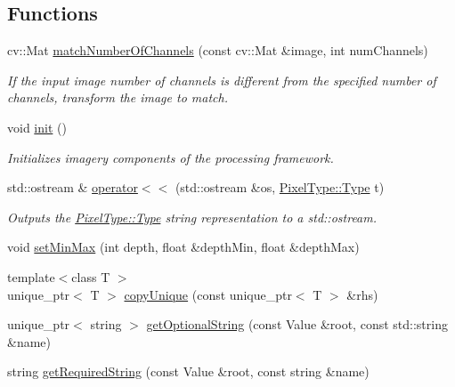 \subsection*{Functions}
\begin{DoxyCompactItemize}
\item 
cv\+::\+Mat \hyperlink{group___imagery_module_ga95eb6f615115ac89f33bed1f11861a13}{match\+Number\+Of\+Channels} (const cv\+::\+Mat \&image, int num\+Channels)
\begin{DoxyCompactList}\small\item\em If the input image number of channels is different from the specified number of channels, transform the image to match. \end{DoxyCompactList}\item 
void \hyperlink{namespacedg_1_1deepcore_1_1imagery_afb6943a9434cf1b3ec557cb83392ee16}{init} ()
\begin{DoxyCompactList}\small\item\em Initializes imagery components of the processing framework. \end{DoxyCompactList}\item 
std\+::ostream \& \hyperlink{group___imagery_module_ga46f637f6cee80168d9ad3724aa75c7df}{operator$<$$<$} (std\+::ostream \&os, \hyperlink{namespacedg_1_1deepcore_1_1imagery_1_1_pixel_type_a5f0c62edf4601cbd15e52b381697069d}{Pixel\+Type\+::\+Type} t)
\begin{DoxyCompactList}\small\item\em Outputs the \hyperlink{namespacedg_1_1deepcore_1_1imagery_1_1_pixel_type_a5f0c62edf4601cbd15e52b381697069d}{Pixel\+Type\+::\+Type} string representation to a {\ttfamily std\+::ostream}. \end{DoxyCompactList}\item 
void \hyperlink{namespacedg_1_1deepcore_1_1imagery_af97da0ca48f1ad0387fcabc5b3638414}{set\+Min\+Max} (int depth, float \&depth\+Min, float \&depth\+Max)
\item 
{\footnotesize template$<$class T $>$ }\\unique\+\_\+ptr$<$ T $>$ \hyperlink{namespacedg_1_1deepcore_1_1imagery_a4f56adcc4056062e0c0e14ad2b50c3bb}{copy\+Unique} (const unique\+\_\+ptr$<$ T $>$ \&rhs)
\item 
unique\+\_\+ptr$<$ string $>$ \hyperlink{namespacedg_1_1deepcore_1_1imagery_a52b9270f0f9ef5ac00dc3731d46df6e6}{get\+Optional\+String} (const Value \&root, const std\+::string \&name)
\item 
string \hyperlink{namespacedg_1_1deepcore_1_1imagery_a7fe14dfc6bcd76f91894900ca0cd4db6}{get\+Required\+String} (const Value \&root, const string \&name)

\end{DoxyCompactItemize}
